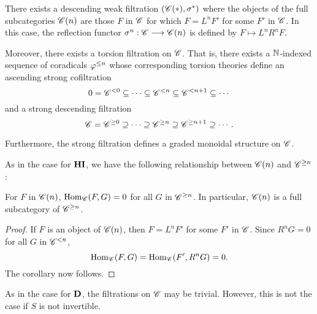 \begin{thm}\label{thm_sum_heart}
There exists a descending weak filtration $(\SGFilt{*}{\Cat{C}}, 
\sgHI{*})$ where the objects of the full subcategories 
$\SGFilt{n}{\Cat{C}}$ are those $F$ in $\Cat{C}$ for which $F = L^nF'$ 
for some $F'$ in $\Cat{C}$. In this case, the reflection functor 
$\sgHI{n}: \Cat{C} \to \SGFilt{n}{\Cat{C}}$ is defined by $F \mapsto 
L^nR^n F$.

Moreover, there exists a torsion filtration on $\Cat{C}$. That is, 
there exists a $\N$-indexed sequence of coradicals $\corad{n}$ 
whose corresponding torsion theories define an ascending strong 
cofiltration
\[
0 = \Corad{0}{\Cat{C}} \subseteq \cdots \subseteq \Corad{n}{\Cat{C}}
   \subseteq \Corad{n + 1}{\Cat{C}} \subseteq \cdots
\]
and a strong descending filtration
\[
\Cat{C} = \Prerad{0}{\Cat{C}} \supseteq \cdots \supseteq \Prerad{n}{\Cat{C}}
\supseteq \Prerad{n + 1}{\Cat{C}} \supseteq \cdots.
\]

Furthermore, the strong filtration defines a graded monoidal 
structure on $\Cat{C}$.
\end{thm}
\noproof

As in the case for $\HI$, we have the following relationship 
between $\SGFilt{n}{\Cat{C}}$ and $\Prerad{n}{\Cat{C}}$:

\begin{cor}\label{cor_sg_sub_prerad}
For $F$ in $\SGFilt{n}{\Cat{C}}$, $\hom_{\Cat{C}}(F, G) = 0$ for
all $G$ in $\Prerad{n}{\Cat{C}}$. In particular, $\SGFilt{n}{\Cat{C}}$
is a full subcategory of $\Prerad{n}{\Cat{C}}$.
\end{cor}
\begin{proof}
If $F$ is an object of $\SGFilt{n}{\Cat{C}}$, then $F = L^n F'$ for
some $F'$ in $\Cat{C}$. Since $R^n G = 0$ for all $G$ in 
$\Corad{n}{\Cat{C}}$,
\[
\hom_{\Cat{C}}(F, G) = \hom_{\Cat{C}}(F', R^n G) = 0.
\]
The corollary now follows.
\end{proof}

As in the case for $\DCat$, the filtrations on $\Cat{C}$ may be
trivial. However, this is not the case if $S$ is not invertible.


